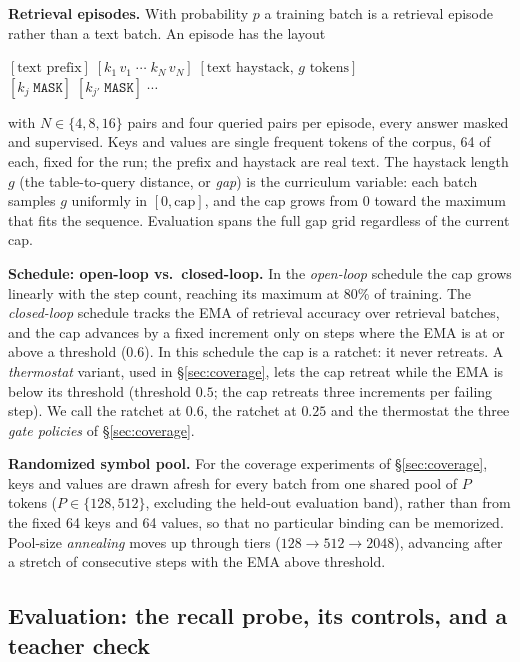 \documentclass{article}
\begin{document}
\textbf{Retrieval episodes.} With probability $p$ a training batch is a retrieval episode rather than a text batch. An episode has the layout
\begin{center}\small
$[\text{text prefix}]\;[k_1\,v_1\;\cdots\;k_N\,v_N]\;[\text{text haystack, } g \text{ tokens}]$\\[2pt]
$[k_j\;\texttt{MASK}]\;[k_{j'}\;\texttt{MASK}]\;\cdots$
\end{center}
with $N \in \{4, 8, 16\}$ pairs and four queried pairs per episode, every answer masked and supervised. Keys and values are single frequent tokens of the corpus, 64 of each, fixed for the run; the prefix and haystack are real text. The haystack length $g$ (the table-to-query distance, or \emph{gap}) is the curriculum variable: each batch samples $g$ uniformly in $[0, \text{cap}]$, and the cap grows from $0$ toward the maximum that fits the sequence. Evaluation spans the full gap grid regardless of the current cap.

\textbf{Schedule: open-loop vs.\ closed-loop.} In the \emph{open-loop} schedule the cap grows linearly with the step count, reaching its maximum at 80\% of training. The \emph{closed-loop} schedule tracks the EMA of retrieval accuracy over retrieval batches, and the cap advances by a fixed increment only on steps where the EMA is at or above a threshold ($0.6$). In this schedule the cap is a ratchet: it never retreats. A \emph{thermostat} variant, used in \S\ref{sec:coverage}, lets the cap retreat while the EMA is below its threshold (threshold $0.5$; the cap retreats three increments per failing step). We call the ratchet at $0.6$, the ratchet at $0.25$ and the thermostat the three \emph{gate policies} of \S\ref{sec:coverage}.

\textbf{Randomized symbol pool.} For the coverage experiments of \S\ref{sec:coverage}, keys and values are drawn afresh for every batch from one shared pool of $P$ tokens ($P \in \{128, 512\}$, excluding the held-out evaluation band), rather than from the fixed 64 keys and 64 values, so that no particular binding can be memorized. Pool-size \emph{annealing} moves up through tiers ($128 \to 512 \to 2048$), advancing after a stretch of consecutive steps with the EMA above threshold.

\subsection{Evaluation: the recall probe, its controls, and a teacher check}\label{sec:probe}
\end{document}
